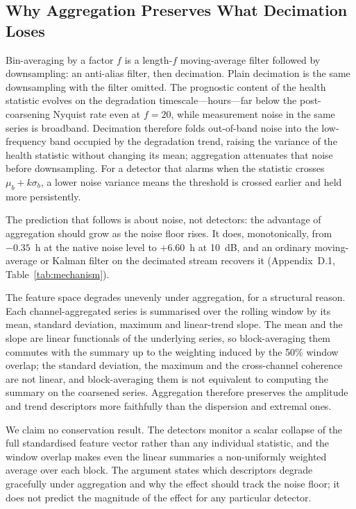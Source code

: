 \documentclass[IJPHM, 2026, 0]{PHMSociety}
\begin{document}
\subsection{Why Aggregation Preserves What Decimation Loses}
\label{sec:signaltheory}
Bin-averaging by a factor $f$ is a length-$f$ moving-average filter followed by downsampling: an anti-alias filter, then decimation. Plain decimation is the same downsampling with the filter omitted. The prognostic content of the health statistic evolves on the degradation timescale---hours---far below the post-coarsening Nyquist rate even at $f=20$, while measurement noise in the same series is broadband. Decimation therefore folds out-of-band noise into the low-frequency band occupied by the degradation trend, raising the variance of the health statistic without changing its mean; aggregation attenuates that noise before downsampling. For a detector that alarms when the statistic crosses $\mu_b + k\sigma_b$, a lower noise variance means the threshold is crossed earlier and held more persistently.

The prediction that follows is about noise, not detectors: the advantage of aggregation should grow as the noise floor rises. It does, monotonically, from $-0.35$~h at the native noise level to $+6.60$~h at 10~dB, and an ordinary moving-average or Kalman filter on the decimated stream recovers it (Appendix~D.1, Table~\ref{tab:mechanism}).

The feature space degrades unevenly under aggregation, for a structural reason. Each channel-aggregated series is summarised over the rolling window by its mean, standard deviation, maximum and linear-trend slope. The mean and the slope are linear functionals of the underlying series, so block-averaging them commutes with the summary up to the weighting induced by the 50\% window overlap; the standard deviation, the maximum and the cross-channel coherence are not linear, and block-averaging them is not equivalent to computing the summary on the coarsened series. Aggregation therefore preserves the amplitude and trend descriptors more faithfully than the dispersion and extremal ones.

We claim no conservation result. The detectors monitor a scalar collapse of the full standardised feature vector rather than any individual statistic, and the window overlap makes even the linear summaries a non-uniformly weighted average over each block. The argument states which descriptors degrade gracefully under aggregation and why the effect should track the noise floor; it does not predict the magnitude of the effect for any particular detector.
\end{document}
